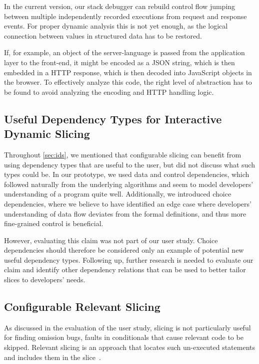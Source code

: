 In the current version, our stack debugger can rebuild control flow jumping between multiple independently recorded executions from request and response events.
For proper dynamic analysis this is not yet enough, as the logical connection between values in structured data has to be restored.

If, for example, an object of the server-language is passed from the application layer to the front-end, it might be encoded as a JSON string, which is then embedded in a HTTP response, which is then decoded into JavaScript objects in the browser.
To effectively analyze this code, the right level of abstraction has to be found to avoid analyzing the encoding and HTTP handling logic.

\subsection{Useful Dependency Types for Interactive Dynamic Slicing}

Throughout \cref{sec:ids}, we mentioned that configurable slicing can benefit from using dependency types that are useful to the user, but did not discuss what such types could be. 
In our prototype, we used data and control dependencies, which followed naturally from the underlying algorithms and seem to model developers’ understanding of a program quite well. 
Additionally, we introduced choice dependencies, where we believe to have identified an edge case
where developers' understanding of data flow deviates from the formal definitions, and thus more fine-grained control is beneficial. 

However, evaluating this claim was not part of our user study.
Choice dependencies should therefore be considered only an example of potential new useful dependency types.
Following up, further research is needed to evaluate our claim and identify other dependency relations that can be used to better tailor slices to developers' needs.

\subsection{Configurable Relevant Slicing}

As discussed in the evaluation of the user study, slicing is not particularly useful for finding omission bugs, \ie faults in conditionals that cause relevant code to be skipped.
Relevant slicing is an approach that locates such un-executed statements and includes them in the slice~\cite{agrawal93:incremental_regression_testing}.

